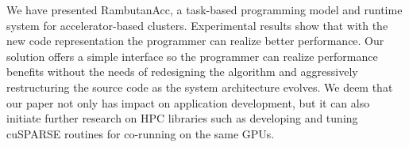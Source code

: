 We have presented RambutanAcc, a task-based programming model and runtime system for accelerator-based clusters.
Experimental results show that with the new code representation the programmer can realize better performance.
Our solution offers a simple interface so the programmer can realize performance benefits without the needs of redesigning the algorithm and aggressively restructuring the source code as the system architecture evolves.
We deem that our paper not only has impact on application development, but it can also initiate further research on HPC libraries such as developing and tuning cuSPARSE routines for co-running on the same GPUs. 
